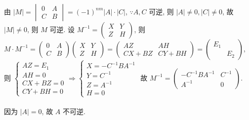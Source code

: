 	 \paragraph{} %
		 由 $|M| = \begin{vmatrix}
				 0 & A \\
				 C & B
			 \end{vmatrix} = (-1)^{nm} |A| \cdot |C|$,
		 $\because A, C$ 可逆, 则 $|A| \neq 0, |C| \neq 0$, 故 $|M| \neq 0$, 则 $M$ 可逆.
		 设 $M^{-1} = \begin{pmatrix}
				 X & Y \\
				 Z & H
			 \end{pmatrix}$,
		 则 $M \cdot M^{-1} = \begin{pmatrix}
				 0 & A \\
				 C & B
			 \end{pmatrix}
			 \begin{pmatrix}
				 X & Y \\
				 Z & H
			 \end{pmatrix} = \begin{pmatrix}
				 AZ      & AH      \\
				 CX + BZ & CY + BH
			 \end{pmatrix} = \begin{pmatrix}
				 E_1 &     \\
				     & E_2
			 \end{pmatrix}$,
		 则 $\begin{cases}
				 AZ = E_1    \\
				 AH = 0      \\
				 CX + BZ = 0 \\
				 CY + BH = 0
			 \end{cases} \Rightarrow \begin{cases}
				 X = -C^{-1}BA^{-1} \\
				 Y = C^{-1}         \\
				 Z = A^{-1}         \\
				 H = 0
			 \end{cases}$
		 故 $M^{-1} = \begin{pmatrix}
				 -C^{-1}BA^{-1} & C^{-1} \\
				 A^{-1}         & 0
			 \end{pmatrix}$.


	 \paragraph{} %
		 因为 $|A| = 0$, 故 $A$ 不可逆.


